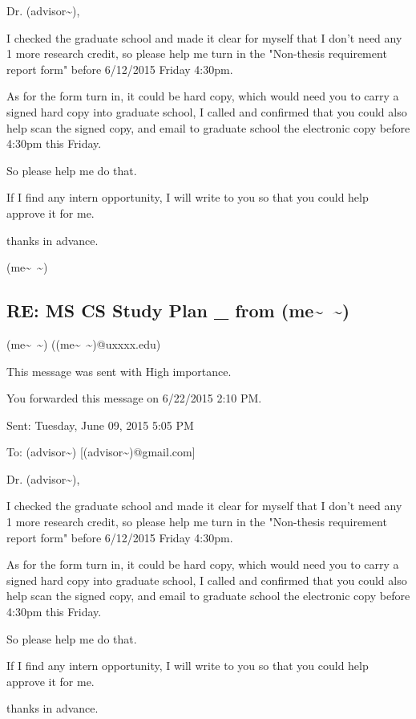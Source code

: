 \documentclass[9pt,b5paper]{article}
\begin{document}
Dr. (advisor\textasciitilde{}), 

I checked the graduate school and made it clear for myself that I don't need any 1 more research credit, so please help me turn in the "Non-thesis requirement report form" before 6/12/2015 Friday 4:30pm. 

As for the form turn in, it could be hard copy, which would need you to carry a signed hard copy into graduate school,  I called and confirmed that you could also help scan the signed copy, and email to graduate school the electronic copy before 4:30pm this Friday. 

So please help me do that. 

If I find any intern opportunity, I will write to you so that you could help approve it for me. 

thanks in advance. 

(me\textasciitilde{}~\textasciitilde{})

\subsection{RE: MS CS Study Plan \_ from (me\textasciitilde{}~\textasciitilde{})}
\label{sec-7-6}
(me\textasciitilde{}~\textasciitilde{}) ((me\textasciitilde{}~\textasciitilde{})@uxxxx.edu)

This message was sent with High importance.

You forwarded this message on 6/22/2015 2:10 PM.

Sent:        Tuesday, June 09, 2015 5:05 PM

To:        
(advisor\textasciitilde{}) [(advisor\textasciitilde{})@gmail.com]

Dr. (advisor\textasciitilde{}), 

I checked the graduate school and made it clear for myself that I don't need any 1 more research credit, so please help me turn in the "Non-thesis requirement report form" before 6/12/2015 Friday 4:30pm. 

As for the form turn in, it could be hard copy, which would need you to carry a signed hard copy into graduate school,  I called and confirmed that you could also help scan the signed copy, and email to graduate school the electronic copy before 4:30pm this Friday. 

So please help me do that. 

If I find any intern opportunity, I will write to you so that you could help approve it for me. 

thanks in advance. 
\end{document}
